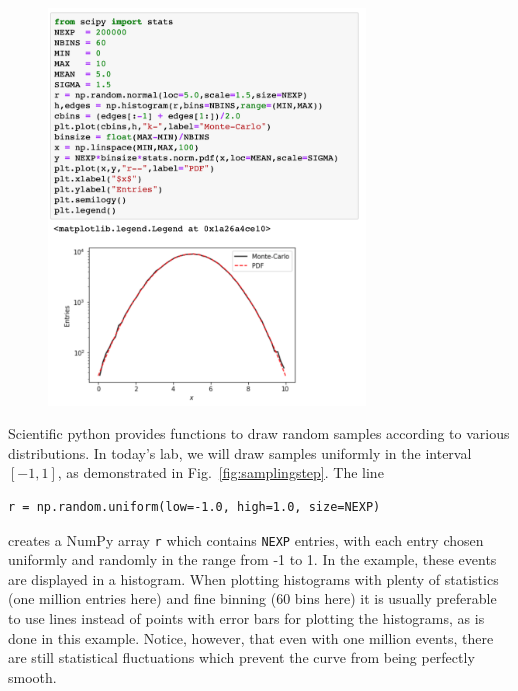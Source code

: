 \begin{figure}[htbp]
\begin{center}
\includegraphics[width=0.75\textwidth]{figs/uncertainties/gaussian.png}\\ 
\end{center}
\caption{\label{fig:samplinggauss}}
\end{figure}

Scientific python provides functions to draw random samples according
to various distributions.  In today's lab, we will draw samples
uniformly in the interval $[-1,1]$, as demonstrated in Fig.~\ref{fig:samplingstep}.   The line
\begin{verbatim}
r = np.random.uniform(low=-1.0, high=1.0, size=NEXP)
\end{verbatim}
creates a NumPy array {\tt r} which contains {\tt NEXP} entries, with
each entry chosen uniformly and randomly in the range from -1 to 1.
In the example, these events are displayed in a histogram.  When
plotting histograms with plenty of statistics (one million entries
here) and fine binning (60 bins here) it is usually preferable to use
lines instead of points with error bars for plotting the histograms,
as is done in this example.  Notice, however, that even with one
million events, there are still statistical fluctuations which prevent
the curve from being perfectly smooth.

